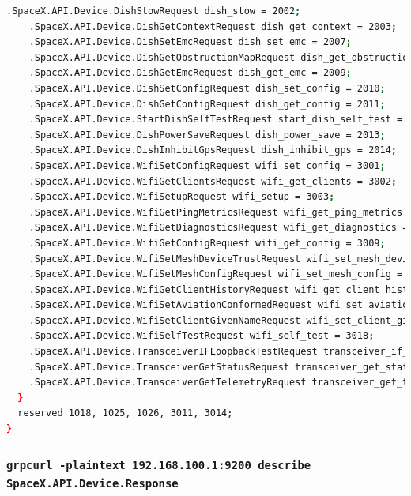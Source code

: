 \documentclass[IN,11pt,twoside,openright,bachelor,english]{tumthesis}
\begin{document}
\begin{lstlisting}[language=bash,basicstyle=\tiny]
    .SpaceX.API.Device.DishStowRequest dish_stow = 2002;
    .SpaceX.API.Device.DishGetContextRequest dish_get_context = 2003;
    .SpaceX.API.Device.DishSetEmcRequest dish_set_emc = 2007;
    .SpaceX.API.Device.DishGetObstructionMapRequest dish_get_obstruction_map = 2008;
    .SpaceX.API.Device.DishGetEmcRequest dish_get_emc = 2009;
    .SpaceX.API.Device.DishSetConfigRequest dish_set_config = 2010;
    .SpaceX.API.Device.DishGetConfigRequest dish_get_config = 2011;
    .SpaceX.API.Device.StartDishSelfTestRequest start_dish_self_test = 2012;
    .SpaceX.API.Device.DishPowerSaveRequest dish_power_save = 2013;
    .SpaceX.API.Device.DishInhibitGpsRequest dish_inhibit_gps = 2014;
    .SpaceX.API.Device.WifiSetConfigRequest wifi_set_config = 3001;
    .SpaceX.API.Device.WifiGetClientsRequest wifi_get_clients = 3002;
    .SpaceX.API.Device.WifiSetupRequest wifi_setup = 3003;
    .SpaceX.API.Device.WifiGetPingMetricsRequest wifi_get_ping_metrics = 3007;
    .SpaceX.API.Device.WifiGetDiagnosticsRequest wifi_get_diagnostics = 3008;
    .SpaceX.API.Device.WifiGetConfigRequest wifi_get_config = 3009;
    .SpaceX.API.Device.WifiSetMeshDeviceTrustRequest wifi_set_mesh_device_trust = 3012;
    .SpaceX.API.Device.WifiSetMeshConfigRequest wifi_set_mesh_config = 3013 [deprecated = true];
    .SpaceX.API.Device.WifiGetClientHistoryRequest wifi_get_client_history = 3015;
    .SpaceX.API.Device.WifiSetAviationConformedRequest wifi_set_aviation_conformed = 3016;
    .SpaceX.API.Device.WifiSetClientGivenNameRequest wifi_set_client_given_name = 3017;
    .SpaceX.API.Device.WifiSelfTestRequest wifi_self_test = 3018;
    .SpaceX.API.Device.TransceiverIFLoopbackTestRequest transceiver_if_loopback_test = 4001;
    .SpaceX.API.Device.TransceiverGetStatusRequest transceiver_get_status = 4003;
    .SpaceX.API.Device.TransceiverGetTelemetryRequest transceiver_get_telemetry = 4004;
  }
  reserved 1018, 1025, 1026, 3011, 3014;
}
\end{lstlisting}

\subsubsection{\texttt{grpcurl -plaintext 192.168.100.1:9200 describe SpaceX.API.Device.Response}}
\end{document}
